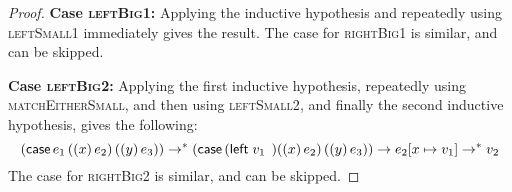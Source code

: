\documentclass{homework}
\begin{document}
\begin{proof}
  \vspace{0.5em}\noindent\textbf{Case \textsc{leftBig1}:}
  Applying the inductive hypothesis and repeatedly using \textsc{leftSmall1} immediately gives the result.
  The case for \textsc{rightBig1} is similar, and can be skipped.

  \vspace{0.5em}\noindent\textbf{Case \textsc{leftBig2}:}
  Applying the first inductive hypothesis, repeatedly using \textsc{matchEitherSmall}, and then using \textsc{leftSmall2}, and finally the second inductive hypothesis, gives the following:
  $$(\textsf{case}\,e_1\,((x)\,e_2)\,((y)\,e_3)) \to^\ast (\textsf{case}\,(\textsf{left}\;v_1\;\,)((x)\,e_2)\,((y)\,e_3)) \to e_2[x \mapsto v_1] \to^\ast v_2$$
  The case for \textsc{rightBig2} is similar, and can be skipped.
\end{proof}
\end{document}

